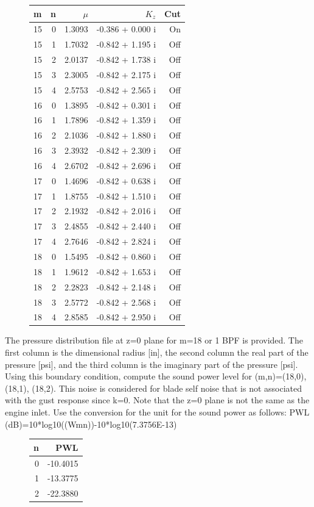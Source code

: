 \documentclass[onecolumn,10pt]{jhwhw}
\begin{document}
\begin{figure}[h]
\centering
\begin{tabular}{lr|rr|r}
\toprule
 m &  n &   $\mu$ &             $K_z$ &    Cut \\
\midrule
15 &  0 &  1.3093 & -0.386 +  0.000 i &    On  \\
15 &  1 &  1.7032 & -0.842 +  1.195 i &    Off \\
15 &  2 &  2.0137 & -0.842 +  1.738 i &    Off \\
15 &  3 &  2.3005 & -0.842 +  2.175 i &    Off \\
15 &  4 &  2.5753 & -0.842 +  2.565 i &    Off \\
\midrule
16 &  0 &  1.3895 & -0.842 +  0.301 i &    Off \\
16 &  1 &  1.7896 & -0.842 +  1.359 i &    Off \\
16 &  2 &  2.1036 & -0.842 +  1.880 i &    Off \\
16 &  3 &  2.3932 & -0.842 +  2.309 i &    Off \\
16 &  4 &  2.6702 & -0.842 +  2.696 i &    Off \\
\midrule
17 &  0 &  1.4696 & -0.842 +  0.638 i &    Off \\
17 &  1 &  1.8755 & -0.842 +  1.510 i &    Off \\
17 &  2 &  2.1932 & -0.842 +  2.016 i &    Off \\
17 &  3 &  2.4855 & -0.842 +  2.440 i &    Off \\
17 &  4 &  2.7646 & -0.842 +  2.824 i &    Off \\
\midrule
18 &  0 &  1.5495 & -0.842 +  0.860 i &    Off \\
18 &  1 &  1.9612 & -0.842 +  1.653 i &    Off \\
18 &  2 &  2.2823 & -0.842 +  2.148 i &    Off \\
18 &  3 &  2.5772 & -0.842 +  2.568 i &    Off \\
18 &  4 &  2.8585 & -0.842 +  2.950 i &    Off \\
\bottomrule
\end{tabular}
\end{figure}

\clearpage
\problem{[30 points]}
The pressure distribution file at z=0 plane for m=18 or 1 BPF is provided. The first column is the dimensional radius [in], the second column the real part of the pressure [psi], and the third column is the imaginary part of the pressure [psi]. Using this boundary condition, compute the sound power level for (m,n)=(18,0), (18,1), (18,2). This noise is considered for blade self noise that is not associated with the gust response since k=0. Note that the z=0 plane is not the same as the engine inlet. Use the conversion for the unit for the sound power as follows: PWL (dB)=10*log10((Wmn))-10*log10(7.3756E-13)

\begin{figure}[h]
\centering
\begin{tabular}{rr}
\toprule
n &         PWL \\
\midrule
  0 &  -10.4015 \\
  1 &  -13.3775 \\
  2 &  -22.3880 \\
\bottomrule
\end{tabular}
\end{figure}

\clearpage

\end{document}
